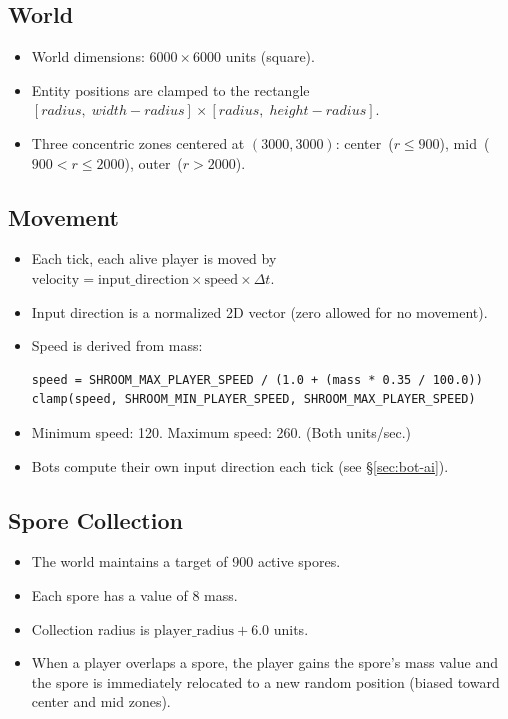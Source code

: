 \documentclass[11pt]{article}
\begin{document}
\subsection{World}

\begin{itemize}
  \item World dimensions: $6000 \times 6000$ units (square).
  \item Entity positions are clamped to the rectangle $[radius,\; width - radius] \times [radius,\; height - radius]$.
  \item Three concentric zones centered at $(3000, 3000)$: center~($r \le 900$), mid~($900 < r \le 2000$), outer~($r > 2000$).
\end{itemize}

\subsection{Movement}

\begin{itemize}
  \item Each tick, each alive player is moved by $\text{velocity} = \text{input\_direction} \times \text{speed} \times \Delta t$.
  \item Input direction is a normalized 2D vector (zero allowed for no movement).
  \item Speed is derived from mass:
    \begin{verbatim}
speed = SHROOM_MAX_PLAYER_SPEED / (1.0 + (mass * 0.35 / 100.0))
clamp(speed, SHROOM_MIN_PLAYER_SPEED, SHROOM_MAX_PLAYER_SPEED)
    \end{verbatim}
  \item Minimum speed: 120. Maximum speed: 260. (Both units/sec.)
  \item Bots compute their own input direction each tick (see \S\ref{sec:bot-ai}).
\end{itemize}

\subsection{Spore Collection}

\begin{itemize}
  \item The world maintains a target of 900 active spores.
  \item Each spore has a value of 8 mass.
  \item Collection radius is $\text{player\_radius} + 6.0$ units.
  \item When a player overlaps a spore, the player gains the spore's mass value and the spore is immediately relocated to a new random position (biased toward center and mid zones).
\end{itemize}
\end{document}

